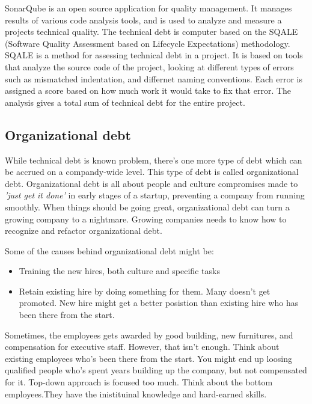 





SonarQube is an open source application for quality management. It manages results of various code analysis tools, and is used to analyze and measure a projects technical quality. The technical debt is computer based on the SQALE (Software Quality Assessment based on Lifecycle Expectations) methodology. SQALE is a method for assessing technical debt in a project. It is based on tools that analyze the source code of the project, looking at different types of errors such as mismatched indentation, and differnet naming conventions. Each error is assigned a score based on how much work it would take to fix that error. The analysis gives a total sum of technical debt for the entire project.



\subsection{Organizational debt}
While technical debt is known problem, there's one more type of debt which can be accrued on a compandy-wide level. This type of debt is called organizational debt. Organizational debt is all about people and culture compromises made to \textit{'just get it done'} in early stages of a startup, preventing a company from running smoothly\cite{steve-blank}. When things should be going great, organizational debt can turn a growing company to a nightmare. Growing companies needs to know how to recognize and refactor organizational debt. 

Some of the causes behind organizational debt might be:

\begin{itemize}
	\item Training the new hires, both culture and specific tasks
	\item Retain existing hire by doing something for them. Many doesn't get promoted. New hire might get a better posistion than existing hire who has been there from the start.
\end{itemize}

Sometimes, the employees gets awarded by good building, new furnitures, and compensation for executive staff. However, that isn't enough. Think about existing employees who's been there from the start. You might end up loosing qualified people who's spent years building up the company, but not compensated for it. Top-down approach is focused too much. Think about the bottom employees.They have the inistituinal knowledge and hard-earned skills.

